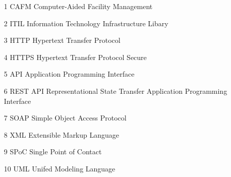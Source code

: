 \documentclass[fontsize=12pt]{scrartcl}
\begin{document}
\vspace*{-1cm}
\setcounter{page}{4}
\tableofcontents
\newpage

\vspace*{-1cm}
\listoffigures
\newpage

\begin{itemize}[leftmargin=*] 
\item[1] CAFM \tabto{3cm} Computer-Aided Facility Management
\item[2] ITIL \tabto{3cm} Information Technology Infrastructure Libary
\item[3] HTTP \tabto{3cm} Hypertext Transfer Protocol
\item[4] HTTPS \tabto{3cm} Hypertext Transfer Protocol Secure
\item[5] API \tabto{3cm} Application Programming Interface
\item[6] REST API \tabto{3cm} Representational State Transfer Application Programming Interface
\item[7] SOAP \tabto{3cm} Simple Object Access Protocol
\item[8] XML \tabto{3cm} Extensible Markup Language
\item[9] SPoC \tabto{3cm} Single Point of Contact
\item[10] UML \tabto{3cm} Unifed Modeling Language
\end{itemize}
\newpage

\vspace*{-1cm}
\listoftables
\newpage
\end{document}
